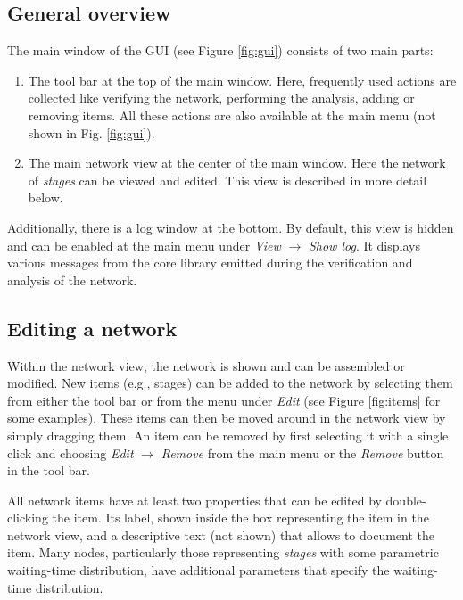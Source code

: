\subsection{General overview}
The main window of the GUI (see Figure \ref{fig:gui}) consists of two main parts:
\begin{enumerate}
 \item The tool bar at the top of the main window. Here, frequently used actions are collected like verifying the network, performing the analysis,
 adding or removing items. All these actions are also available at the main menu (not shown in Fig. \ref{fig:gui}).
 \item The main network view at the center of the main window. Here the network of \emph{stages} can be viewed and edited. This view is described in more detail below.
\end{enumerate}

Additionally, there  is a log window at the bottom. By default, this view is hidden and can be enabled at the main menu under \emph{View} $\rightarrow$ \emph{Show log}. It displays various messages from the core library emitted during the verification and analysis of the network. 


\subsection{Editing a network}
Within the network view, the network is shown and can be assembled or modified. New items (e.g., stages) can be added to the network by selecting them from either the tool bar or from the menu under \emph{Edit} (see Figure \ref{fig:items} for some examples). These items can then be moved around in the network view by simply dragging them. An item can be removed by first selecting it with a single click and choosing \emph{Edit} $\rightarrow$ \emph{Remove} from the main menu or the \emph{Remove} button in the tool bar.

All network items have at least two properties that can be edited by double-clicking the item. Its label, shown inside the box representing the item in the network view, and a descriptive text (not shown) that allows to document the item. Many nodes, particularly those representing \emph{stages} with some parametric waiting-time distribution, have additional parameters that specify the waiting-time distribution. 

